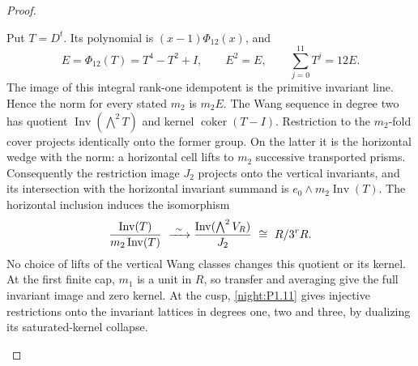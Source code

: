 \begin{proof}
\begin{enumerate}[label={$\langle1\rangle$\arabic*.}]
Put $T=D^t$.  Its polynomial is $(x-1)\Phi_{12}(x)$, and
\[
 E=\Phi_{12}(T)=T^4-T^2+I,\qquad E^2=E,\qquad
 \sum_{j=0}^{11}T^j=12E.
\]
The image of this integral rank-one idempotent is the primitive
invariant line.  Hence the norm for every stated $m_2$ is $m_2E$.
The Wang sequence in degree two has quotient
$\operatorname{Inv}(\bigwedge^2T)$ and kernel
$\operatorname{coker}(T-I)$.  Restriction to the $m_2$-fold cover
projects identically onto the former group.  On the latter it is
the horizontal wedge with the norm: a horizontal cell lifts to
$m_2$ successive transported prisms.
Consequently the restriction image $J_2$ projects onto the vertical
invariants, and its intersection with the horizontal invariant
summand is $e_0\wedge m_2\operatorname{Inv}(T)$.
The horizontal inclusion induces the isomorphism
\[
 \frac{\operatorname{Inv}(T)}{m_2\operatorname{Inv}(T)}
 \ \xrightarrow{\ \sim\ }\\
 \frac{\operatorname{Inv}(\bigwedge^2V_R)}{J_2}
 \ \cong\ R/3^rR.
\]
No choice of lifts of the vertical Wang classes changes this
quotient or its kernel.  At the first finite cap, $m_1$ is a unit
in $R$, so transfer and averaging give the full invariant image
and zero kernel.  At the cusp, \cref{night:P1.11} gives injective
restrictions onto the invariant lattices in degrees one, two
and three, by dualizing its saturated-kernel collapse.


\end{enumerate}
\end{proof}
